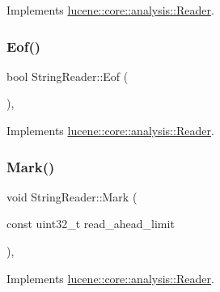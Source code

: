 Implements \mbox{\hyperlink{classlucene_1_1core_1_1analysis_1_1Reader_a4be7e96dccdd3e276e3450e3ad7a70f4}{lucene\+::core\+::analysis\+::\+Reader}}.

\mbox{\label{classlucene_1_1core_1_1analysis_1_1StringReader_a7697e462ff19e3e8fa135e38fa3e4999}} 
\subsubsection{\texorpdfstring{Eof()}{Eof()}}
{\footnotesize\ttfamily bool String\+Reader\+::\+Eof (\begin{DoxyParamCaption}{ }\end{DoxyParamCaption})\hspace{0.3cm}{\ttfamily [override]}, {\ttfamily [virtual]}}



Implements \mbox{\hyperlink{classlucene_1_1core_1_1analysis_1_1Reader_af7a24f3904f9c40e9c5c204b3434f1f7}{lucene\+::core\+::analysis\+::\+Reader}}.

\mbox{\label{classlucene_1_1core_1_1analysis_1_1StringReader_a0ba42881881e4790dae54bc1c01063f5}} 
\subsubsection{\texorpdfstring{Mark()}{Mark()}}
{\footnotesize\ttfamily void String\+Reader\+::\+Mark (\begin{DoxyParamCaption}\item[{const uint32\+\_\+t}]{read\+\_\+ahead\+\_\+limit }\end{DoxyParamCaption})\hspace{0.3cm}{\ttfamily [override]}, {\ttfamily [virtual]}}



Implements \mbox{\hyperlink{classlucene_1_1core_1_1analysis_1_1Reader_a0b60b07a3f65098a50f10f6618097527}{lucene\+::core\+::analysis\+::\+Reader}}.

